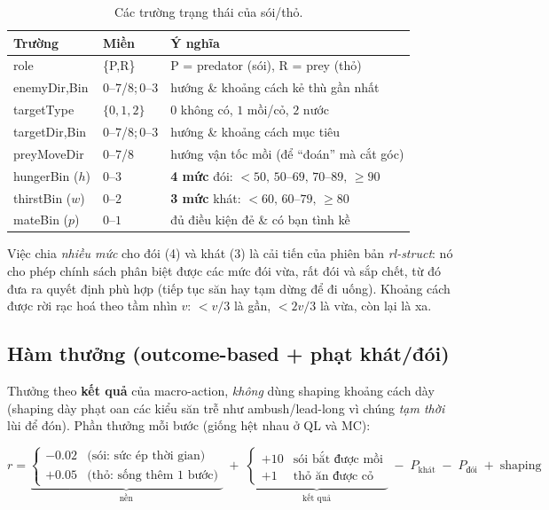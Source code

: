 \documentclass[11pt,a4paper]{article}
\begin{document}
\begin{table}[h]
\centering
\caption{Các trường trạng thái của sói/thỏ.}
\label{tab:state}
\small
\begin{tabular}{llp{8.4cm}}
\toprule
Trường & Miền & Ý nghĩa \\
\midrule
role            & \{P,R\}          & P = predator (sói), R = prey (thỏ) \\
enemyDir,Bin    & $0$--$7$/$8$;\,$0$--$3$ & hướng \& khoảng cách kẻ thù gần nhất \\
targetType      & $\{0,1,2\}$      & $0$ không có, $1$ mồi/cỏ, $2$ nước \\
targetDir,Bin   & $0$--$7$/$8$;\,$0$--$3$ & hướng \& khoảng cách mục tiêu \\
preyMoveDir     & $0$--$7$/$8$     & hướng vận tốc mồi (để ``đoán'' mà cắt góc) \\
hungerBin ($h$) & $0$--$3$         & \textbf{4 mức} đói: $<50,\,50\text{--}69,\,70\text{--}89,\,\geq 90$ \\
thirstBin ($w$) & $0$--$2$         & \textbf{3 mức} khát: $<60,\,60\text{--}79,\,\geq 80$ \\
mateBin ($p$)   & $0$--$1$         & đủ điều kiện đẻ \& có bạn tình kề \\
\bottomrule
\end{tabular}
\end{table}

Việc chia \emph{nhiều mức} cho đói (4) và khát (3) là cải tiến của phiên bản \emph{rl-struct}: nó
cho phép chính sách phân biệt được các mức đói vừa, rất đói và sắp chết, từ đó đưa ra quyết định
phù hợp (tiếp tục săn hay tạm dừng để đi uống). Khoảng cách được rời rạc hoá theo tầm nhìn $v$:
$<v/3$ là gần, $<2v/3$ là vừa, còn lại là xa.

\subsection{Hàm thưởng (outcome-based + phạt khát/đói)}\label{sec:reward}

Thưởng theo \textbf{kết quả} của macro-action, \emph{không} dùng shaping khoảng cách dày (shaping
dày phạt oan các kiểu săn trễ như ambush/lead-long vì chúng \emph{tạm thời} lùi để đón). Phần
thưởng mỗi bước (giống hệt nhau ở QL và MC):

\begin{equation}
r =
\underbrace{\begin{cases} -0.02 & \text{(sói: sức ép thời gian)}\\[1mm] +0.05 & \text{(thỏ: sống thêm 1 bước)}\end{cases}}_{\text{nền}}
\;+\;
\underbrace{\begin{cases} +10 & \text{sói bắt được mồi}\\ +1 & \text{thỏ ăn được cỏ}\end{cases}}_{\text{kết quả}}
\;-\; P_{\text{khát}} \;-\; P_{\text{đói}} \;+\; \text{shaping}
\end{equation}
\end{document}
